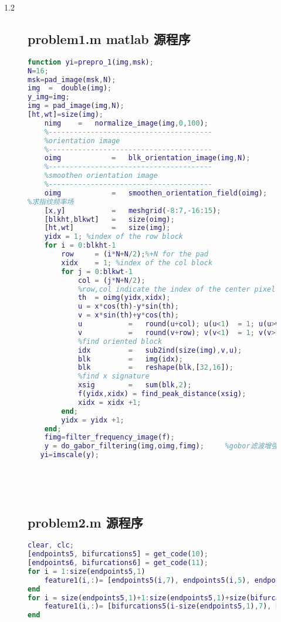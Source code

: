 \documentclass{whutmod}
\begin{document}
\begin{spacing}{1.2}
\begin{figure}[H]
\subsection{problem1.m matlab 源程序}
\begin{lstlisting}[language=matlab]
	function yi=prepro_1(img,msk);
N=16;
msk=pad_image(msk,N);
img  =  double(img);
y_img=img;
img = pad_image(img,N);
[ht,wt]=size(img);
    nimg    =   normalize_image(img,0,100);
    %---------------------------------------
    %orientation image
    %---------------------------------------
    oimg            =   blk_orientation_image(img,N);
    %---------------------------------------
    %smoothen orientation image
    %---------------------------------------
    oimg            =   smoothen_orientation_field(oimg);
%求指纹频率场
    [x,y]           =   meshgrid(-8:7,-16:15);
    [blkht,blkwt]   =   size(oimg);
    [ht,wt]         =   size(img);
    yidx = 1; %index of the row block
    for i = 0:blkht-1
        row     = (i*N+N/2);%+N for the pad
        xidx    = 1; %index of the col block
        for j = 0:blkwt-1   
            col = (j*N+N/2);
            %row,col indicate the index of the center pixel
            th  = oimg(yidx,xidx);
            u = x*cos(th)-y*sin(th);
            v = x*sin(th)+y*cos(th);
            u           =   round(u+col); u(u<1)  = 1; u(u>wt) = wt;
            v           =   round(v+row); v(v<1)  = 1; v(v>ht) = ht;
            %find oriented block
            idx         =   sub2ind(size(img),v,u);
            blk         =   img(idx);
            blk         =   reshape(blk,[32,16]);
            %find x signature
            xsig        =   sum(blk,2);
            f(yidx,xidx) = find_peak_distance(xsig);
            xidx = xidx +1;
        end;
        yidx = yidx +1;
    end;
    fimg=filter_frequency_image(f);
    y = do_gabor_filtering(img,oimg,fimg);     %gobor滤波增强图像
   yi=imscale(y);

    

	
\end{lstlisting}

\subsection{problem2.m 源程序}
\begin{lstlisting}[language=matlab]
	clear, clc;
[endpoints5, bifurcations5] = get_code(10);
[endpoints6, bifurcations6] = get_code(11);
for i = 1:size(endpoints5,1)
    feature1(i,:)= [endpoints5(i,7), endpoints5(i,5), endpoints5(i,6), 1, endpoints5(i,3)];
end
for i = size(endpoints5,1)+1:size(endpoints5,1)+size(bifurcations5,1)
    feature1(i,:)= [bifurcations5(i-size(endpoints5,1),7), bifurcations5(i-size(endpoints5,1),5), bifurcations5(i-size(endpoints5,1),6), 2, bifurcations5(i-size(endpoints5,1),3)];
end


\end{lstlisting}
\end{figure}
\end{spacing}
\end{document}
